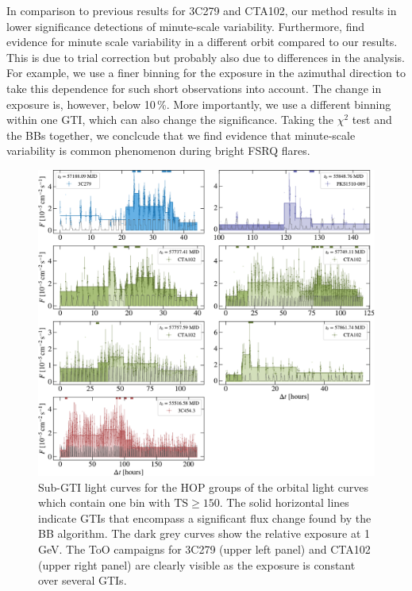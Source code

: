 \documentclass[twocolumn,linenumbers]{aastex62}
\begin{document}
In comparison to previous results for 3C279 and CTA102, our method results in lower significance detections of minute-scale variability.
Furthermore, \citet{2018ApJ...854L..26S} find evidence for minute scale variability in a different orbit compared to our results.
This is due to trial correction but probably also due to differences in the analysis.
For example, we use a finer binning for the exposure in the azimuthal direction to take this dependence for such short observations into account.
The change in exposure is, however, below 10\,\%.
More importantly, we use a different binning within one GTI, which can also change the significance. 
Taking the $\chi^2$ test and the BBs together, we conclcude that we find evidence that minute-scale variability is common phenomenon during bright FSRQ flares. %
\begin{figure}
    \centering
    \includegraphics[width = .9\linewidth]{figures/lc_minute_3min.pdf}
    \caption{Sub-GTI light curves for the HOP groups of the orbital light curves which contain one bin with $\mathrm{TS} \geqslant 150$. The solid horizontal lines indicate GTIs that encompass a significant flux change found by the BB algorithm. The dark grey curves show the relative exposure at 1\,GeV. The ToO campaigns for 3C279 (upper left panel) and CTA102 (upper right panel) are clearly visible as the exposure is constant over several GTIs. }
    \label{fig:lc_minutes}
\end{figure}
\end{document}
